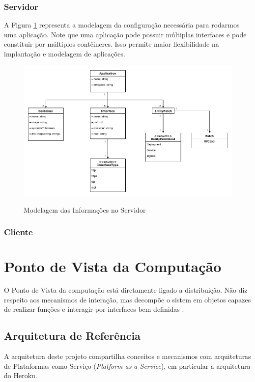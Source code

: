 	        \subsubsection{Servidor}
	        A Figura \ref{fig:info-server} representa a modelagem da configuração necessária para rodarmos uma aplicação. Note que uma aplicação pode possuir múltiplas interfaces e pode constituir por múltiplos contêineres. Isso permite maior flexibilidade na implantação e modelagem de aplicações.
	        \begin{figure}[htb]
        	    \centering
        	    \caption{Modelagem das Informações no Servidor}
        	    \includegraphics[scale=0.40]{pictures/especificacao-de-requisitos/info-server.png}
        	    \label{fig:info-server}
	        \end{figure}
	        \subsubsection{Cliente}
	            
	\section{Ponto de Vista da Computação}
	    O Ponto de Vista da computação está diretamente ligado a distribuição. Não diz respeito aos mecanismos de interação, mas decompõe o sistem em objetos capazes de realizar funções e interagir por interfaces bem definidas \cite{odppart1}.
	    \subsection{Arquitetura de Referência} %
	        A arquitetura deste projeto compartilha conceitos e mecanismos com arquiteturas de Plataformas como Serviço (\textit{Platform as a Service}), em particular a arquitetura do Heroku.
	        
